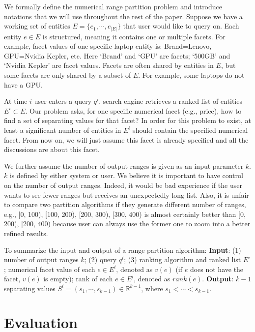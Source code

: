 We formally define the numerical range partition problem and introduce notations that we will use throughout the rest of the paper. Suppose we have a working set of entities $E=\{e_1, \cdots, e_{|E|}\}$ that user would like to query on. Each entity $e\in E$ is structured, meaning it contains one or multiple facets. For example, facet values of one specific laptop entity is: Brand=Lenovo, GPU=Nvidia Kepler, etc. Here `Brand' and `GPU' are facets; `500GB' and `Nvidia Kepler' are facet values. Facets are often shared by entities in $E$, but some facets are only shared by a subset of $E$. For example, some laptops do not have a GPU. 


At time $i$ user enters a query $q^i$, search engine retrieves a ranked list of entities $E^i\subset E$. Our problem asks, for one specific numerical facet (e.g., price), how to find a set of separating values for that facet? In order for this problem to exist, at least a significant number of entities in $E^i$ should contain the specified numerical facet. From now on, we will just assume this facet is already specified and all the discussions are about this facet. 

We further assume the number of output ranges is given as an input parameter $k$. $k$ is defined by either system or user. We believe it is important to have control on the number of output ranges. Indeed, it would be bad experience if the user wants to see fewer ranges but receives an unexpectedly long list. Also, it is unfair to compare two partition algorithms if they generate different number of ranges, e.g., [0, 100), [100, 200), [200, 300), [300, 400) is almost certainly better than [0, 200), [200, 400) because user can always use the former one to zoom into a better refined results. 

To summarize the input and output of a range partition algorithm: \textbf{Input}: (1) number of output ranges $k$; (2) query $q^i$; (3) ranking algorithm and ranked list $E^i$; numerical facet value of each $e\in E^i$, denoted as $v(e)$ (if $e$ does not have the facet, $v(e)$ is empty); rank of each $e\in E^i$, denoted as $rank(e)$. \textbf{Output}: $k-1$ separating values $S^i = (s_1, \cdots, s_{k-1})\in \mathbb{R}^{k-1}$, where $s_1 < \cdots < s_{k-1}$.

\section{Evaluation}


